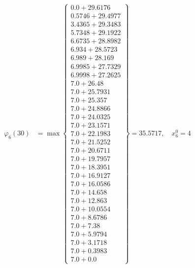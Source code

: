 \documentclass{article}
\begin{document}
\begin{align*}
\varphi_{6}(30) &= \max \left\{ \begin{array}{c}
0.0 + 29.6176 \\
 0.5746 + 29.4977 \\
 3.4365 + 29.3483 \\
 5.7348 + 29.1922 \\
 6.6735 + 28.8982 \\
 6.934 + 28.5723 \\
 6.989 + 28.169 \\
 6.9985 + 27.7329 \\
 6.9998 + 27.2625 \\
 7.0 + 26.48 \\
 7.0 + 25.7931 \\
 7.0 + 25.357 \\
 7.0 + 24.8866 \\
 7.0 + 24.0325 \\
 7.0 + 23.1571 \\
 7.0 + 22.1983 \\
 7.0 + 21.5252 \\
 7.0 + 20.6711 \\
 7.0 + 19.7957 \\
 7.0 + 18.3951 \\
 7.0 + 16.9127 \\
 7.0 + 16.0586 \\
 7.0 + 14.658 \\
 7.0 + 12.863 \\
 7.0 + 10.0554 \\
 7.0 + 8.6786 \\
 7.0 + 7.38 \\
 7.0 + 5.9794 \\
 7.0 + 3.1718 \\
 7.0 + 0.3983 \\
 7.0 + 0.0
\end{array} \right\}=35.5717, \quad x_{6}^0=4\\
  

\end{align*}
\end{document}

